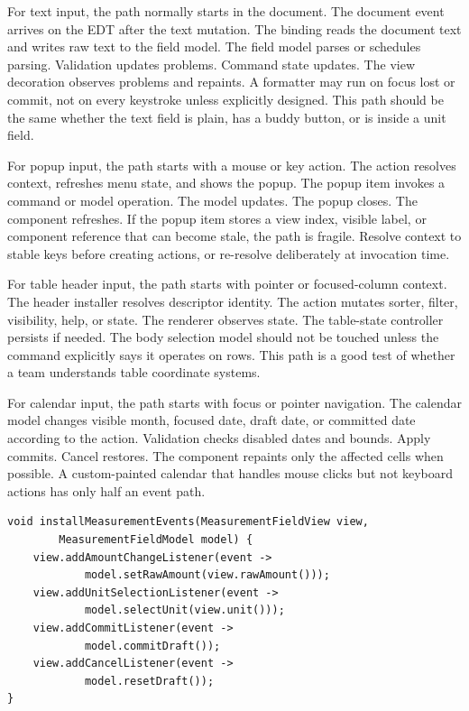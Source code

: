 For text input, the path normally starts in the document. The document event
arrives on the EDT after the text mutation. The binding reads the document
text and writes raw text to the field model. The field model parses or
schedules parsing. Validation updates problems. Command state updates. The
view decoration observes problems and repaints. A formatter may run on focus
lost or commit, not on every keystroke unless explicitly designed. This path
should be the same whether the text field is plain, has a buddy button, or is
inside a unit field.

For popup input, the path starts with a mouse or key action. The action
resolves context, refreshes menu state, and shows the popup. The popup item
invokes a command or model operation. The model updates. The popup closes.
The component refreshes. If the popup item stores a view index, visible label,
or component reference that can become stale, the path is fragile. Resolve
context to stable keys before creating actions, or re-resolve deliberately at
invocation time.

For table header input, the path starts with pointer or focused-column
context. The header installer resolves descriptor identity. The action mutates
sorter, filter, visibility, help, or state. The renderer observes state. The
table-state controller persists if needed. The body selection model should
not be touched unless the command explicitly says it operates on rows. This
path is a good test of whether a team understands table coordinate systems.

For calendar input, the path starts with focus or pointer navigation. The
calendar model changes visible month, focused date, draft date, or committed
date according to the action. Validation checks disabled dates and bounds.
Apply commits. Cancel restores. The component repaints only the affected
cells when possible. A custom-painted calendar that handles mouse clicks but
not keyboard actions has only half an event path.

\begin{lstlisting}[caption={Event paths should converge on model operations.}]
void installMeasurementEvents(MeasurementFieldView view,
        MeasurementFieldModel model) {
    view.addAmountChangeListener(event ->
            model.setRawAmount(view.rawAmount()));
    view.addUnitSelectionListener(event ->
            model.selectUnit(view.unit()));
    view.addCommitListener(event ->
            model.commitDraft());
    view.addCancelListener(event ->
            model.resetDraft());
}
\end{lstlisting}

